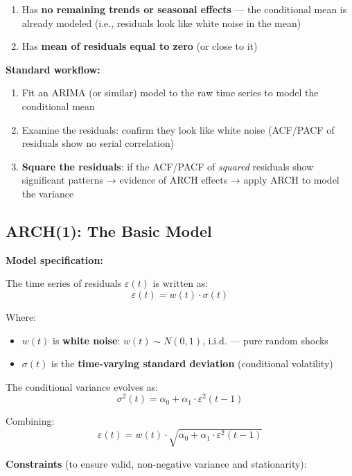 \documentclass[12pt,openany]{book}
\theoremstyle{definition}
\theoremstyle{remark}
\begin{document}
\begin{enumerate}
\item Has \textbf{no remaining trends or seasonal effects} --- the conditional mean is already modeled (i.e., residuals look like white noise in the mean)


\item Has \textbf{mean of residuals equal to zero} (or close to it)


\end{enumerate}
\textbf{Standard workflow:}

\begin{enumerate}
\item Fit an ARIMA (or similar) model to the raw time series to model the conditional mean


\item Examine the residuals: confirm they look like white noise (ACF/PACF of residuals show no serial correlation)


\item \textbf{Square the residuals}: if the ACF/PACF of \emph{squared} residuals show significant patterns → evidence of ARCH effects → apply ARCH to model the variance


\end{enumerate}
\medskip
\subsection{ARCH(1): The Basic Model}
\textbf{Model specification:}

The time series of residuals ${\varepsilon(t)}$ is written as: \[
\varepsilon(t) = w(t) \cdot \sigma(t)
\]

Where:

\begin{itemize}
\item $w(t)$ is \textbf{white noise}: $w(t) \sim N(0, 1)$, i.i.d. --- pure random shocks


\item $\sigma(t)$ is the \textbf{time-varying standard deviation} (conditional volatility)


\end{itemize}
The conditional variance evolves as: \[
\sigma^2(t) = \alpha_0 + \alpha_1 \cdot \varepsilon^2(t-1)
\]

Combining: \[
\boxed{\varepsilon(t) = w(t) \cdot \sqrt{\alpha_0 + \alpha_1 \cdot \varepsilon^2(t-1)}}
\]

\textbf{Constraints} (to ensure valid, non-negative variance and stationarity):
\end{document}
